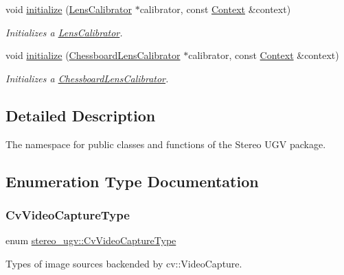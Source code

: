 \begin{DoxyCompactItemize}
void \hyperlink{namespacestereo__ugv_aab7c44a98ba3f61baec2e4c1c9802bee}{initialize} (\hyperlink{classstereo__ugv_1_1LensCalibrator}{Lens\+Calibrator} $\ast$calibrator, const \hyperlink{classstereo__ugv_1_1Context}{Context} \&context)
\begin{DoxyCompactList}\small\item\em Initializes a \hyperlink{classstereo__ugv_1_1LensCalibrator}{Lens\+Calibrator}. \end{DoxyCompactList}\item 
void \hyperlink{namespacestereo__ugv_a8e8ff522fb8d2300fcdfc02ab0025e98}{initialize} (\hyperlink{classstereo__ugv_1_1ChessboardLensCalibrator}{Chessboard\+Lens\+Calibrator} $\ast$calibrator, const \hyperlink{classstereo__ugv_1_1Context}{Context} \&context)
\begin{DoxyCompactList}\small\item\em Initializes a \hyperlink{classstereo__ugv_1_1ChessboardLensCalibrator}{Chessboard\+Lens\+Calibrator}. \end{DoxyCompactList}\end{DoxyCompactItemize}


\subsection{Detailed Description}
The namespace for public classes and functions of the Stereo U\+GV package. 

\subsection{Enumeration Type Documentation}
\mbox{\label{namespacestereo__ugv_a5c139e7cfac12e9270ca903f1ce2e4bc}} 
\subsubsection{\texorpdfstring{Cv\+Video\+Capture\+Type}{CvVideoCaptureType}}
{\footnotesize\ttfamily enum \hyperlink{namespacestereo__ugv_a5c139e7cfac12e9270ca903f1ce2e4bc}{stereo\+\_\+ugv\+::\+Cv\+Video\+Capture\+Type}\hspace{0.3cm}{\ttfamily [strong]}}



Types of image sources backended by cv\+::\+Video\+Capture. 

